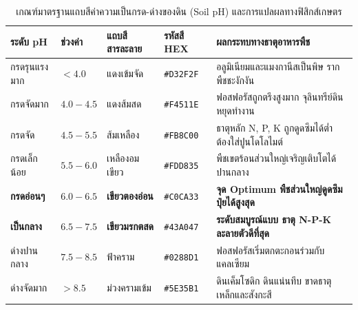 \begin{table}[H]
\centering
\caption{เกณฑ์มาตรฐานแถบสีค่าความเป็นกรด-ด่างของดิน (Soil pH) และการแปลผลทางฟิสิกส์เกษตร}
\label{tab:soil_ph_color_scale}
\begin{tabularx}{\textwidth}{p{2.6cm}p{1.8cm}p{2.8cm}p{1.8cm}Y}
    \toprule
    \textbf{ระดับ pH} & \textbf{ช่วงค่า} & \textbf{แถบสีสารละลาย} & \textbf{รหัสสี HEX} & \textbf{ผลกระทบทางธาตุอาหารพืช} \\
    \midrule
    กรดรุนแรงมาก & $< 4.0$ & แดงเข้มจัด & \texttt{\#D32F2F} & อลูมิเนียมและแมงกานีสเป็นพิษ รากพืชชะงักงัน \\
    กรดจัดมาก & $4.0 - 4.5$ & แดงส้มสด & \texttt{\#F4511E} & ฟอสฟอรัสถูกตรึงสูงมาก จุลินทรีย์ดินหยุดทำงาน \\
    กรดจัด & $4.5 - 5.5$ & ส้มเหลือง & \texttt{\#FB8C00} & ธาตุหลัก N, P, K ถูกดูดซึมได้ต่ำ ต้องใส่ปูนโดโลไมต์ \\
    กรดเล็กน้อย & $5.5 - 6.0$ & เหลืองอมเขียว & \texttt{\#FDD835} & พืชเขตร้อนส่วนใหญ่เจริญเติบโตได้ปานกลาง \\
    \textbf{กรดอ่อนๆ} & $\mathbf{6.0 - 6.5}$ & \textbf{เขียวตองอ่อน} & \texttt{\#C0CA33} & \textbf{จุด Optimum พืชส่วนใหญ่ดูดซึมปุ๋ยได้สูงสุด} \\
    \textbf{เป็นกลาง} & $\mathbf{6.5 - 7.5}$ & \textbf{เขียวมรกตสด} & \texttt{\#43A047} & \textbf{ระดับสมบูรณ์แบบ ธาตุ N-P-K ละลายตัวดีที่สุด} \\
    ด่างปานกลาง & $7.5 - 8.5$ & ฟ้าคราม & \texttt{\#0288D1} & ฟอสฟอรัสเริ่มตกตะกอนร่วมกับแคลเซียม \\
    ด่างจัดมาก & $> 8.5$ & ม่วงครามเข้ม & \texttt{\#5E35B1} & ดินเค็มโซดิก ดินแน่นทึบ ขาดธาตุเหล็กและสังกะสี \\
    \bottomrule
\end{tabularx}
\end{table}

